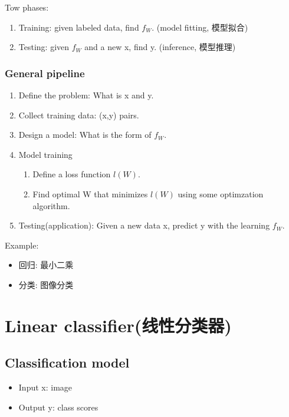 Tow phases:
\begin{enumerate}
    \item Training: given labeled data, find $f_W$. (model fitting, 模型拟合)
    \item Testing: given $f_W$ and a new x, find y. (inference, 模型推理)
\end{enumerate}

\subsubsection{General pipeline}
\begin{enumerate}
    \item Define the problem: What is x and y. 
    \item Collect training data: (x,y) pairs.
    \item Design a model: What is the form of $f_W$.
    \item Model training
    \begin{enumerate}
        \item Define a loss function $l(W)$.
        \item Find optimal W that minimizes $l(W)$ using some optimzation algorithm. 
    \end{enumerate}
    \item Testing(application): Given a new data x, predict y with the learning $f_W$. 
\end{enumerate}

Example: 
\begin{itemize}
    \item 回归: 最小二乘
    \item 分类: 图像分类
\end{itemize}
\section{Linear classifier(线性分类器)}
\subsection{Classification model}
\begin{itemize}
    \item Input x: image
    \item Output y: class scores
\end{itemize}

